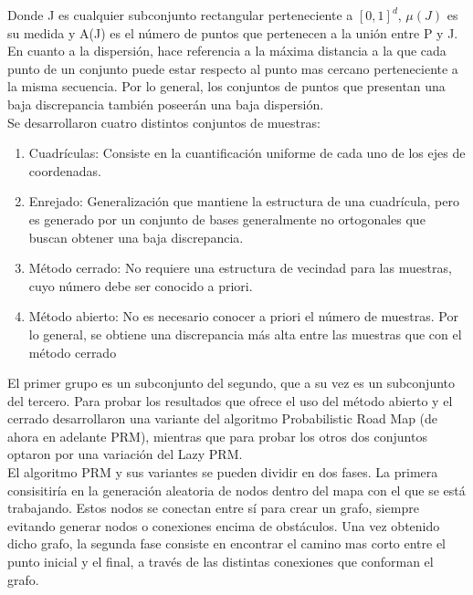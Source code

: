 Donde J es cualquier subconjunto rectangular perteneciente a $[0,1]^{d}$, $\mu(J)$ es su medida y A(J) es el número de puntos que pertenecen a la unión entre P y J. En cuanto a la dispersión, hace referencia a la máxima distancia a la que cada punto de un conjunto puede estar respecto al punto mas cercano perteneciente a la misma secuencia. Por lo general, los conjuntos de puntos que presentan una baja discrepancia también poseerán una baja dispersión.
\\

Se desarrollaron cuatro distintos conjuntos de muestras:
\begin{enumerate}
\item Cuadrículas: Consiste en la cuantificación uniforme de cada uno de los ejes de coordenadas.
\item Enrejado: Generalización que mantiene la estructura de una cuadrícula, pero es generado por un conjunto de bases generalmente no ortogonales que buscan obtener una baja discrepancia.
\item Método cerrado: No requiere una estructura de vecindad para las muestras, cuyo número debe ser conocido a priori.
\item Método abierto: No es necesario conocer a priori el número de muestras. Por lo general, se obtiene una discrepancia más alta entre las muestras que con el método cerrado 
\end{enumerate}

El primer grupo es un subconjunto del segundo, que a su vez es un subconjunto del tercero. Para probar los resultados que ofrece el uso del método abierto y el cerrado desarrollaron una variante del algoritmo Probabilistic Road Map (de ahora en adelante PRM), mientras que para probar los otros dos conjuntos optaron por una variación del Lazy PRM.
\\

El algoritmo PRM y sus variantes se pueden dividir en dos fases. La primera consisitiría en la generación aleatoria de nodos dentro del mapa con el que se está trabajando. Estos nodos se conectan entre sí para crear un grafo, siempre evitando generar nodos o conexiones encima de obstáculos. Una vez obtenido dicho grafo, la segunda fase consiste en encontrar el camino mas corto entre el punto inicial y el final, a través de las distintas conexiones que conforman el grafo.
\\

